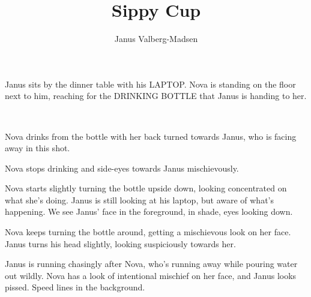 \documentclass[a4paper,12pt,unpaged]{../comicscript}
\title{Sippy Cup}
\author{Janus Valberg-Madsen}
\begin{document}
\maketitle

Janus sits by the dinner table with his LAPTOP. 
Nova is standing on the floor next to him, reaching for the DRINKING BOTTLE that Janus is handing to her.
\begin{lettering}
     \\
\end{lettering}

\label{panel:drinking}
Nova drinks from the bottle with her back turned towards Janus, who is facing away in this shot.
\begin{lettering}
\end{lettering}

Nova stops drinking and side-eyes towards Janus mischievously.

\label{panel:pouring}
Nova starts slightly turning the bottle upside down, looking concentrated on what she’s doing. 
Janus is still looking at his laptop, but aware of what’s happening. 
We see Janus’ face in the foreground, in shade, eyes looking down.
\begin{lettering}
\end{lettering}

Nova keeps turning the bottle around, getting a mischievous look on her face.
Janus turns his head slightly, looking suspiciously towards her.

Janus is running chasingly after Nova, who’s running away while pouring water out wildly. 
Nova has a look of intentional mischief on her face, and Janus looks pissed. 
Speed lines in the background.
\end{document}
